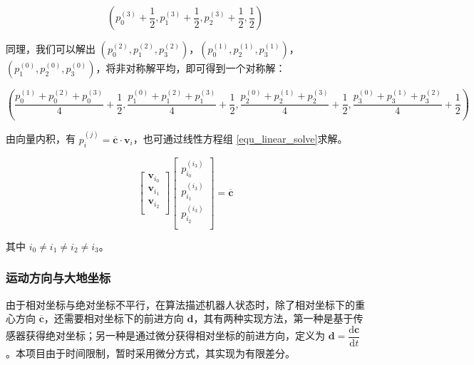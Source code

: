 \documentclass[a4paper]{ctexart}
\numberwithin{equation}{section}
\numberwithin{table}{section}
\numberwithin{figure}{section}
\begin{document}
\begin{equation}
  \left(p_0^{(3)} +\frac{1}{2}, p_1^{(3)} +\frac{1}{2}, p_2^{(3)} + \frac{1}{2}, \frac{1}{2}\right)
\end{equation}

同理，我们可以解出 $\left(p_0^{(2)},p_1^{(2)},p_3^{(2)}\right)$，$\left(p_0^{(1)},p_2^{(1)},p_3^{(1)}\right)$，$\left(p_1^{(0)},p_2^{(0)},p_3^{(0)}\right)$，将非对称解平均，即可得到一个对称解：

\begin{equation}
  \left(
    \frac{p_0^{(1)}+p_0^{(2)}+p_0^{(3)}}{4} +\frac{1}{2},
    \frac{p_1^{(0)}+p_1^{(2)}+p_1^{(3)}}{4} +\frac{1}{2},
    \frac{p_2^{(0)}+p_2^{(1)}+p_2^{(3)}}{4} +\frac{1}{2},
    \frac{p_3^{(0)}+p_3^{(1)}+p_3^{(2)}}{4} +\frac{1}{2}
  \right)
\end{equation}

由向量内积，有 $p_i^{(j)} = \overline{\boldsymbol c} \cdot \boldsymbol v_i$，也可通过线性方程组
\ref{equ_linear_solve}求解。

\begin{equation}
  \begin{bmatrix}
    \boldsymbol v_{i_0} \\
    \boldsymbol v_{i_1} \\
    \boldsymbol v_{i_2} \\
  \end{bmatrix}
  \begin{bmatrix}
    p_{i_0}^{(i_3)} \\
    p_{i_1}^{(i_3)} \\
    p_{i_2}^{(i_3)} \\
  \end{bmatrix}
  =
  \overline{\boldsymbol c}
  \label{equ_linear_solve}
\end{equation}

其中 $i_0\neq i_1\neq i_2\neq i_3$。


\subsubsection{运动方向与大地坐标}

由于相对坐标与绝对坐标不平行，在算法描述机器人状态时，除了相对坐标下的重心方向 $\overline{\boldsymbol c}$，还需要相对坐标下的前进方向 $\boldsymbol d$，其有两种实现方法，第一种是基于传感器获得绝对坐标；另一种是通过微分获得相对坐标的前进方向，定义为 $\boldsymbol d=\dfrac{\mathrm d\boldsymbol c}{\mathrm d t}$。本项目由于时间限制，暂时采用微分方式，其实现为有限差分。
\end{document}
